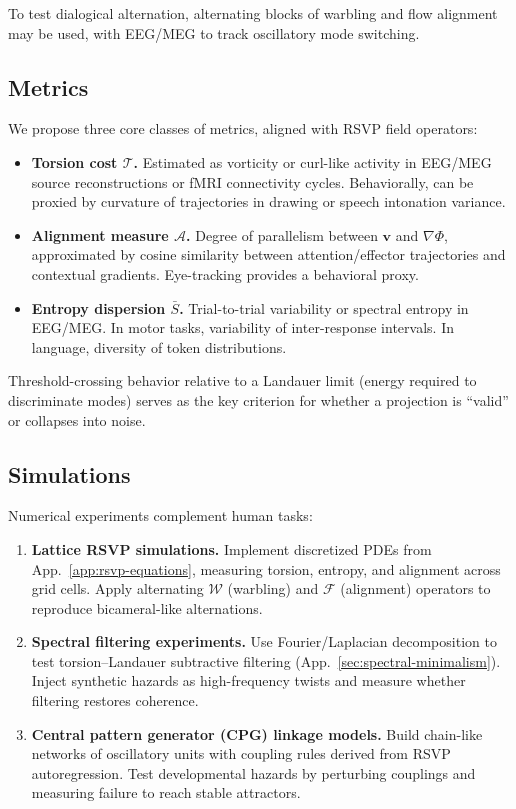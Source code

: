 \documentclass[a4paper,11pt]{article}
\begin{document}
To test dialogical alternation, alternating blocks of warbling and flow
alignment may be used, with EEG/MEG to track oscillatory mode switching.

\subsection{Metrics}
We propose three core classes of metrics, aligned with RSVP field operators:

\begin{itemize}
\item \textbf{Torsion cost $\mathcal{T}$.} Estimated as vorticity or curl-like
activity in EEG/MEG source reconstructions or fMRI connectivity cycles.
Behaviorally, can be proxied by curvature of trajectories in drawing or speech
intonation variance.

\item \textbf{Alignment measure $\mathcal{A}$.} Degree of parallelism between
$\mathbf v$ and $\nabla \Phi$, approximated by cosine similarity between
attention/effector trajectories and contextual gradients. Eye-tracking provides
a behavioral proxy.

\item \textbf{Entropy dispersion $\bar{S}$.} Trial-to-trial variability or
spectral entropy in EEG/MEG. In motor tasks, variability of inter-response
intervals. In language, diversity of token distributions.
\end{itemize}

Threshold-crossing behavior relative to a Landauer limit (energy required to
discriminate modes) serves as the key criterion for whether a projection is
``valid'' or collapses into noise.

\subsection{Simulations}
Numerical experiments complement human tasks:

\begin{enumerate}
\item \textbf{Lattice RSVP simulations.} Implement discretized PDEs from
App.~\ref{app:rsvp-equations}, measuring torsion, entropy, and alignment across
grid cells. Apply alternating $\mathcal{W}$ (warbling) and $\mathcal{F}$
(alignment) operators to reproduce bicameral-like alternations.

\item \textbf{Spectral filtering experiments.} Use Fourier/Laplacian
decomposition to test torsion--Landauer subtractive filtering
(App.~\ref{sec:spectral-minimalism}). Inject synthetic hazards as
high-frequency twists and measure whether filtering restores coherence.

\item \textbf{Central pattern generator (CPG) linkage models.} Build chain-like
networks of oscillatory units with coupling rules derived from RSVP
autoregression. Test developmental hazards by perturbing couplings and
measuring failure to reach stable attractors.
\end{enumerate}
\end{document}
